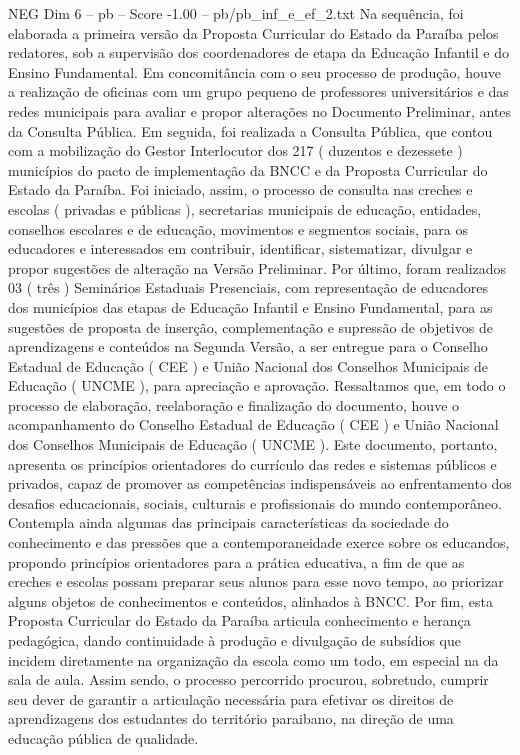 \begin{textsample}{NEG Dim 6 – pb – Score -1.00 – pb/pb\_inf\_e\_ef\_2.txt}
Na sequência, foi elaborada a primeira versão da Proposta Curricular do Estado da Paraíba pelos redatores, sob a supervisão dos coordenadores de etapa da Educação Infantil e do Ensino Fundamental.
Em concomitância com o seu processo de produção, houve a realização de oficinas com um grupo pequeno de professores universitários e das redes municipais para avaliar e propor alterações no Documento Preliminar, antes da Consulta Pública.
Em seguida, foi realizada a Consulta Pública, que contou com a mobilização do Gestor Interlocutor dos 217 ( duzentos e dezessete ) municípios do pacto de implementação da BNCC e da Proposta Curricular do Estado da Paraíba.
Foi iniciado, assim, o processo de consulta nas creches e escolas ( privadas e públicas ), secretarias municipais de educação, entidades, conselhos escolares e de educação, movimentos e segmentos sociais, para os educadores e interessados em contribuir, identificar, sistematizar, divulgar e propor sugestões de alteração na Versão Preliminar.
Por último, foram realizados 03 ( três ) Seminários Estaduais Presenciais, com representação de educadores dos municípios das etapas de Educação Infantil e Ensino Fundamental, para as sugestões de proposta de inserção, complementação e supressão de objetivos de aprendizagens e conteúdos na Segunda Versão, a ser entregue para o Conselho Estadual de Educação ( CEE ) e União Nacional dos Conselhos Municipais de Educação ( UNCME ), para apreciação e aprovação.
Ressaltamos que, em todo o processo de elaboração, reelaboração e finalização do documento, houve o acompanhamento do Conselho Estadual de Educação ( CEE ) e União Nacional dos Conselhos Municipais de Educação ( UNCME ).
Este documento, portanto, apresenta os princípios orientadores do currículo das redes e sistemas públicos e privados, capaz de promover as competências indispensáveis ao enfrentamento dos desafios educacionais, sociais, culturais e profissionais do mundo contemporâneo.
Contempla ainda algumas das principais características da sociedade do conhecimento e das pressões que a contemporaneidade exerce sobre os educandos, propondo princípios orientadores para a prática educativa, a fim de que as creches e escolas possam preparar seus alunos para esse novo tempo, ao priorizar alguns objetos de conhecimentos e conteúdos, alinhados à BNCC.
Por fim, esta Proposta Curricular do Estado da Paraíba articula conhecimento e herança pedagógica, dando continuidade à produção e divulgação de subsídios que incidem diretamente na organização da escola como um todo, em especial na da sala de aula.
Assim sendo, o processo percorrido procurou, sobretudo, cumprir seu dever de garantir a articulação necessária para efetivar os direitos de aprendizagens dos estudantes do território paraibano, na direção de uma educação pública de qualidade.

\end{textsample}
